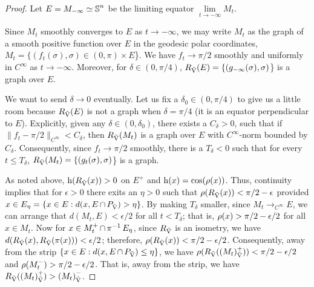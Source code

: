 \documentclass{amsart}
\theoremstyle{definition}
\theoremstyle{remark}
\numberwithin{equation}{section}
\begin{document}
\begin{proof}
Let \(E = M_{-\infty} \simeq \operatorname{\mathbb{S}}^n\) be the limiting equator \(\lim\limits_{t\to-\infty} M_t\).

Since \(M_t\) smoothly converges to \(E\) as \(t\to-\infty\), we may write \(M_t\) as the graph of a smooth positive function over \(E\) in the geodesic polar coordinates, \(M_t = \{(f_t(\sigma), \sigma) \in (0,\pi) \times E\)\}. We have \(f_t \to \pi/2\) smoothly and uniformly in \(C^{\infty}\) as \(t \to -\infty\). Moreover, for \(\delta \in (0,\pi/4)\), \(R_{\operatorname{\vec{V}}}(E) = \{(g_{-\infty}(\sigma), \sigma)\)\} is a graph over \(E\).

We want to send \(\delta \to 0\) eventually. Let us fix a \(\delta_0 \in (0,\pi/4)\) to give us a little room because \(R_{\operatorname{\vec{V}}}(E)\) is not a graph when \(\delta = \pi/4\) (it is an equator perpendicular to \(E\)). Explicitly, given any \(\delta \in (0,\delta_0)\), there exists a \(C_{\delta} > 0\), such that if \(\|f_t - \pi/2\|_{C^{\infty}} < C_{\delta}\), then \(R_{\operatorname{\vec{V}}}(M_t)\) is a graph over \(E\) with \(C^{\infty}\)-norm bounded by \(C_{\delta}\). Consequently, since \(f_t \to \pi/2\) smoothly, there is a \(T_{\delta} < 0\) such that for every \(t \leq T_{\delta}\), \(R_{\operatorname{\vec{V}}}(M_t) =\{ (g_t(\sigma), \sigma)\)\} is a graph.

As noted above, \(\operatorname{h}(R_{\operatorname{\vec{V}}}(x)) > 0\) on \(E^+\) and \(\operatorname{h}(x) = \cos(\operatorname{\rho}(x))\). Thus, continuity implies that for \(\epsilon > 0\) there exits an \(\eta>0\) such that \(\operatorname{\rho}(R_{\operatorname{\vec{V}}}(x)) < \pi/2 - \epsilon\) provided \(x \in E_{\eta} = \{x \in E: d(x, E \operatorname{\cap} P_{\operatorname{\vec{V}}}) > \eta\}\). By making \(T_{\delta}\) smaller, since \(M_t \to_{C^{\infty}} E\), we can arrange that \(d(M_t, E) < \epsilon/2\) for all \(t < T_{\delta}\); that is, \(\operatorname{\rho} (x) > \pi/2 - \epsilon/2\) for all \(x \in M_t\). Now for \(x \in M_t^+ \operatorname{\cap} \operatorname{\pi}^{-1} E_{\eta}\), since \(R_{\operatorname{\vec{V}}}\) is an isometry, we have \(d(R_{\operatorname{\vec{V}}}(x), R_{\operatorname{\vec{V}}}(\operatorname{\pi}(x))) < \epsilon/2\); therefore, \(\operatorname{\rho}(R_{\operatorname{\vec{V}}}(x)) < \pi/2 - \epsilon/2\). Consequently, away from the strip \(\{x \in E: d(x, E \operatorname{\cap} P_{\operatorname{\vec{V}}}) \leq \eta\}\), we have \(\operatorname{\rho}(R_{\operatorname{\vec{V}}}({(M_t)}_{\operatorname{\vec{V}}}^+)) < \pi/2 - \epsilon/2\) and \(\operatorname{\rho}(M_t^-) > \pi/2 - \epsilon/2\). That is, away from the strip, we have \(R_{\operatorname{\vec{V}}}({(M_t)}_{\operatorname{\vec{V}}}^+) > {(M_t)}_{\operatorname{\vec{V}}}^-\).


\end{proof}
\end{document}
